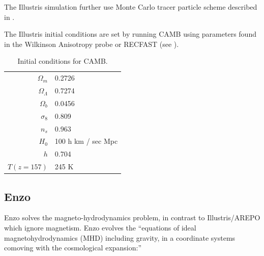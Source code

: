 The Illustris simulation further use Monte Carlo tracer particle scheme described in \cite{genel_following_2013}.

The Illustris initial conditions are set by running CAMB \cite{seljak_line--sight_1996} using parameters found in the Wilkinson Anisotropy probe \cite{hinshaw_nine-year_2013} or RECFAST \cite{seager_new_1999} (see ).

\begin{table}[h]
\begin{tabular}{rl}
  \toprule
  \(\Omega_m\) & 0.2726 \\
  \(\Omega_\Lambda\) & 0.7274 \\
  \(\Omega_b\) & 0.0456 \\
  \(\sigma_8\) & 0.809 \\
  \(n_s\) & 0.963 \\
  \(H_0\) & 100 h km / sec Mpc \\
  \(h\) & 0.704 \\
  \(T(z = 157)\) & 245 K \\
  \bottomrule
\end{tabular}
\caption{Initial conditions for CAMB.}
\label{initial-conditions}
\end{table}

\subsection*{Enzo}

Enzo \cite{oshea_introducing_2004,bryan_enzo_2014} solves the magneto-hydrodynamics problem, in contrast to Illustris/\textsc{AREPO} which ignore magnetism. Enzo evolves the ``equations of ideal magnetohydrodynamics (MHD) including gravity, in a coordinate systems comoving with the cosmological expansion:''

